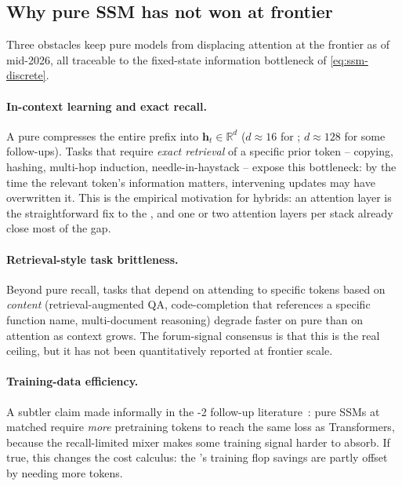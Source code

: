 \subsection{Why pure SSM has not won at frontier}
\label{sec:ssm-frontier}

Three obstacles keep pure  models from displacing attention at the
frontier as of mid-2026, all traceable to the fixed-state information
bottleneck of \eqref{eq:ssm-discrete}.

\paragraph{In-context learning and exact recall.}
A pure  compresses the entire prefix into $\boldsymbol{h}_t \in
\mathbb{R}^d$ ($d \approx 16$ for ; $d \approx 128$ for some
follow-ups). Tasks that require \emph{exact retrieval} of a specific
prior token -- copying, hashing, multi-hop induction,
needle-in-haystack -- expose this bottleneck: by the time the relevant
token's information matters, intervening updates may have overwritten
it. This is
the empirical motivation for hybrids: an attention layer is the
straightforward fix to the , and one or two attention
layers per stack already close most of the gap.

\paragraph{Retrieval-style task brittleness.}
Beyond pure recall, tasks that depend on attending to specific tokens
based on \emph{content} (retrieval-augmented QA, code-completion that
references a specific function name, multi-document reasoning) degrade
faster on pure  than on attention as context grows. The forum-signal
consensus is that this is the real ceiling, but it has not been
quantitatively reported at frontier
scale.

\paragraph{Training-data efficiency.}
A subtler claim made informally in the -2 follow-up
literature~: pure SSMs at matched  require
\emph{more} pretraining tokens to reach the same loss as Transformers,
because the recall-limited mixer makes some training signal harder to
absorb. If true, this changes the cost calculus: the 's training
flop savings are partly offset by needing more tokens.

